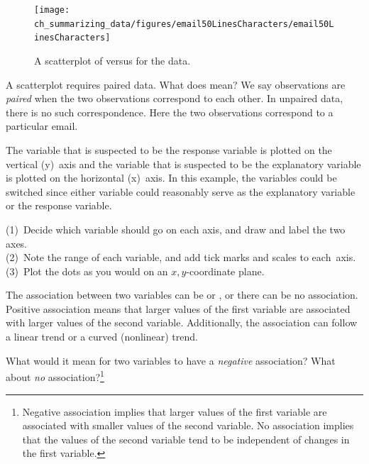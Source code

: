 \textPE{\setlength{\captionwidth}{0.885\textwidth}}

\begin{figure}[h]
   \centering
   \texttt{[image: ch\_summarizing\_data/figures/email50LinesCharacters/email50LinesCharacters]}
   \caption{A scatterplot of  versus  for the  data.}
   \label{email50LinesCharacters}
\end{figure}

\textPE{\setlength{\captionwidth}{\mycaptionwidth}}

\begin{example}{A scatterplot requires paired data. What does  mean?}
We say observations are \emph{paired} when the two observations correspond to each other. In unpaired data, there is no such correspondence. Here the two observations correspond to a particular email.
\end{example}

The variable that is suspected to be the response variable is plotted on the vertical (y)~axis and the variable that is suspected to be the explanatory variable is plotted on the horizontal (x)~axis. In this example, the variables could be switched since either variable could reasonably serve as the explanatory variable or the response variable.

\begin{tipBox}{
(1)~Decide which variable should go on each axis, and draw and label the two axes. \\
(2)~Note the range of each variable, and add tick marks and scales to each~axis. \\
(3)~Plot the dots as you would on an $x,y$-coordinate plane.}
\end{tipBox}

The association between two variables can be  or , or there can be no association. Positive association means that larger values of the first variable are associated with larger values of the second variable. Additionally, the association can follow a linear trend or a curved (nonlinear) trend.

\begin{exercise}What would it mean for two variables to have a \emph{negative} association? What about \emph{no} association?\footnote{Negative association implies that larger values of the first variable are associated with smaller values of the second variable. No association implies that the values of the second variable tend to be independent of changes in the first variable.}
\end{exercise}

